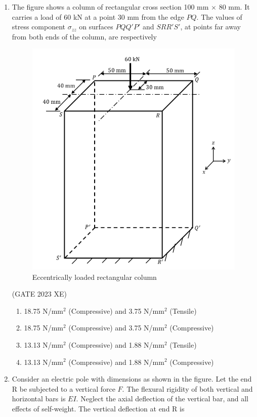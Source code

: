 \documentclass[journal,12pt,onecolumn]{IEEEtran}
\begin{document}
\begin{enumerate}
\newpage

\item The figure shows a column of rectangular cross section 100 mm $\times$ 80 mm. It
carries a load of 60 kN at a point 30 mm from the edge $PQ$. The values of stress
component $\sigma_{zz}$ on surfaces $PQQ'P'$ and $SRR'S'$, at points far away from both
ends of the column, are respectively\\

\begin{figure}[htbp]
\centering
\includegraphics[width=0.4\columnwidth]{figs/C/fig10.png}
\caption{Eccentrically loaded rectangular column}
\label{fig:figs/C/fig10.png}
\end{figure}
\hfill{(GATE 2023 XE)}
\begin{multicols}{2}
\begin{enumerate}
\item 18.75 N/mm$^2$ (Compressive) and 3.75 N/mm$^2$ (Tensile)
\item 18.75 N/mm$^2$ (Compressive) and 3.75 N/mm$^2$ (Compressive)
\item 13.13 N/mm$^2$ (Compressive) and 1.88 N/mm$^2$ (Tensile)
\item 13.13 N/mm$^2$ (Compressive) and 1.88 N/mm$^2$ (Compressive)
\end{enumerate}
\end{multicols}

\item Consider an electric pole with dimensions as shown in the figure. Let the end R be
subjected to a vertical force $F$. The flexural rigidity of both vertical and horizontal
bars is $EI$. Neglect the axial deflection of the vertical bar, and all effects of
self-weight. The vertical deflection at end R is\\


\end{enumerate}
\end{document}
